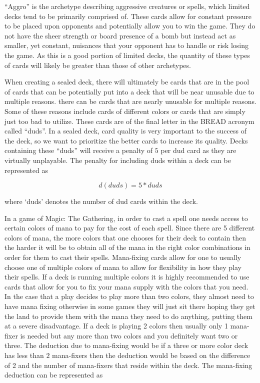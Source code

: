 \documentclass[12pt, letterpaper]{article}
\begin{document}
\enquote{Aggro} is the archetype describing aggressive creatures or spells,
which limited decks tend to be primarily comprised of.
These cards allow for constant pressure to be placed upon opponents
and potentially allow you to win the game.
They do not have the sheer strength or board presence of a bomb
but instead act as smaller, yet constant, nuisances that your opponent
has to handle or risk losing the game.
As this is a good portion of limited decks,
the quantity of these types of cards will likely be greater than those of other archetypes.

When creating a sealed deck,
there will ultimately be cards that are in the pool of cards
that can be potentially put into a deck that will be near unusable due to multiple reasons.
there can be cards that are nearly unusable for multiple reasons.
Some of these reasons include cards of different colors or
cards that are simply just too bad to utilize.
These cards are of the final letter in the BREAD acronym called \enquote{duds}.
In a sealed deck,
card quality is very important to the success of the deck,
so we want to prioritize the better cards to increase its quality.
Decks containing these \enquote{duds} will receive a penalty of $ 5 $ per dud card
as they are virtually unplayable.
The penalty for including duds within a deck can be represented as

$$
d(duds) = 5 * duds
$$

where `duds' denotes the number of dud cards within the deck.

In a game of Magic: The Gathering,
in order to cast a spell one needs access to certain colors of mana to pay for the cost of each spell.
Since there are 5 different colors of mana,
the more colors that one chooses for their deck to contain
then the harder it will be to obtain all of the mana in the right color combinations
in order for them to cast their spells.
Mana-fixing cards allow for one to usually choose one of multiple colors of mana
to allow for flexibility in how they play their spells.
If a deck is running multiple colors
it is highly recommended to use cards that allow for you to fix your
mana supply with the colors that you need.
In the case that a play decides to play more than two colors,
they almost need to have mana fixing
otherwise in some games they will just sit there hoping
they get the land to provide them with the
mana they need to do anything, putting them at a severe disadvantage.
If a deck is playing 2 colors then usually only 1
mana-fixer is needed but any more than two colors and you definitely want two or three.
The deduction due to mana-fixing would be if a three or more color deck
has less than $ 2 $ mana-fixers then the deduction would be based on the difference of
2 and the number of mana-fixers that reside within the deck.
The mana-fixing deduction can be represented as
\end{document}
